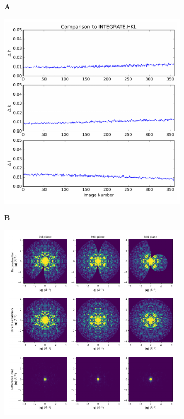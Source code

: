 \documentclass{article}
\begin{document}
\begin{figure}[htb!]
\centering
\begin{subfigure}[t]{0.02\textwidth}
\textbf{A}
\end{subfigure}
\begin{subfigure}[t]{0.45\textwidth}
\includegraphics[width=\textwidth,valign=t]{figures/validation1}
\end{subfigure}
\begin{subfigure}[t]{0.02\textwidth}
\textbf{B}
\end{subfigure}
\begin{subfigure}[t]{0.45\textwidth}
\includegraphics[width=\textwidth,valign=t]{figures/validation2}

\end{subfigure}
\end{figure}
\end{document}
